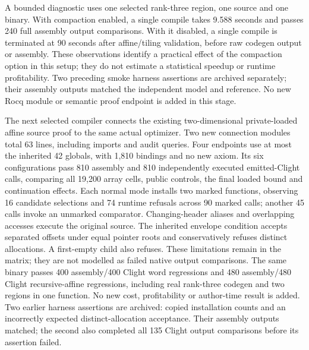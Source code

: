 A bounded diagnostic uses one selected rank-three region, one source and one
binary. With compaction enabled, a single compile takes 9.588 seconds and passes
240 full assembly output comparisons. With it disabled, a single compile is
terminated at 90 seconds after affine/tiling validation, before raw codegen
output or assembly. These observations identify a practical effect of the
compaction option in this setup; they do not estimate a statistical speedup or
runtime profitability. Two preceding smoke harness assertions are archived
separately; their assembly outputs matched the independent model and reference.
No new Rocq module or semantic proof endpoint is added in this stage.

The next selected compiler connects the existing two-dimensional private-loaded
affine source proof to the same actual optimizer. Two new connection modules
total 63 lines, including imports and audit queries. Four endpoints use at most
the inherited 42 globals, with 1,810 bindings and no new axiom. Its six
configurations pass 810 assembly and 810 independently executed emitted-Clight
calls, comparing all 19,200 array cells, public controls, the final loaded bound
and continuation effects. Each normal mode installs two marked functions,
observing 16 candidate selections and 74 runtime refusals across 90 marked
calls; another 45 calls invoke an unmarked comparator. Changing-header aliases
and overlapping accesses execute the original source. The inherited envelope
condition accepts separated offsets under equal pointer roots and
conservatively refuses distinct allocations. A first-empty child also refuses.
These limitations remain in the matrix; they are not modelled as failed native
output comparisons. The same binary passes 400 assembly/400 Clight word
regressions and 480 assembly/480 Clight recursive-affine regressions, including
real rank-three codegen and two regions in one function. No new cost,
profitability or author-time result is added. Two earlier harness assertions
are archived: copied installation counts and an incorrectly expected
distinct-allocation acceptance. Their assembly outputs matched; the second
also completed all 135 Clight output comparisons before its assertion failed.

